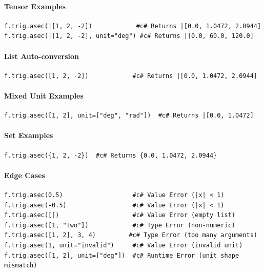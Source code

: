 \paragraph{Tensor Examples}
\begin{verbatim}
f.trig.asec(|[1, 2, -2])            #c# Returns |[0.0, 1.0472, 2.0944]
f.trig.asec(|[1, 2, -2], unit="deg") #c# Returns |[0.0, 60.0, 120.0]
\end{verbatim}

\paragraph{List Auto-conversion}
\begin{verbatim}
f.trig.asec([1, 2, -2])            #c# Returns |[0.0, 1.0472, 2.0944]
\end{verbatim}

\paragraph{Mixed Unit Examples}
\begin{verbatim}
f.trig.asec([1, 2], unit=["deg", "rad"])  #c# Returns |[0.0, 1.0472]
\end{verbatim}

\paragraph{Set Examples}
\begin{verbatim}
f.trig.asec({1, 2, -2})  #c# Returns {0.0, 1.0472, 2.0944}
\end{verbatim}

\paragraph{Edge Cases}
\begin{verbatim}
f.trig.asec(0.5)                   #c# Value Error (|x| < 1)
f.trig.asec(-0.5)                  #c# Value Error (|x| < 1)
f.trig.asec([])                    #c# Value Error (empty list)
f.trig.asec([1, "two"])            #c# Type Error (non-numeric)
f.trig.asec([1, 2], 3, 4)         #c# Type Error (too many arguments)
f.trig.asec(1, unit="invalid")     #c# Value Error (invalid unit)
f.trig.asec([1, 2], unit=["deg"])  #c# Runtime Error (unit shape mismatch)
\end{verbatim}

